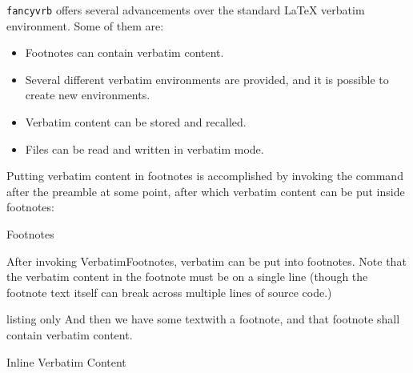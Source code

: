 \documentclass[article,a4paper,oneside,10pt]{memoir}
\makeatletter
\renewcommand{\section}{%
  \sechook%
  \@startsection{section}{1}%
      {\secindent}%
      {\beforesecskip}%
      {\aftersecskip}%
      {\sffamily\secheadstyle}} %
\newcommand\code[1]{\texttt{#1}}
\makeatother
\begin{document}
\code{fancyvrb}  offers  several  advancements   over  the  standard  \LaTeX{}
verbatim environment. Some of them are:

\begin{itemize}\firmlist
    \item
        Footnotes can contain verbatim content.
    \item
        Several  different  verbatim  environments  are provided,  and  it  is
        possible to create new environments.
    \item
        Verbatim content can be stored and recalled.
    \item
        Files can be read and written in verbatim mode.
\end{itemize}

Putting  verbatim  content  in  footnotes  is  accomplished  by  invoking  the
\texttt{\VerbatimFootnotes}  command  after  the  preamble  at  some
point, after which verbatim content can be put inside footnotes:


\section{Footnotes}
\label{sec:fancyvrb:footnotes}

\VerbatimFootnotes
After    invoking    VerbatimFootnotes,    verbatim   can    be    put    into
footnotes\footnotemark. Note that the verbatim content in the footnote must be
on a  single line (though the  footnote text itself can  break across multiple
lines of source code.)


\begin{tcblisting}{listing only}
    \VerbatimFootnotes
    And then we have some text\footnotemark with a footnote, and that footnote
    shall contain verbatim content.
\end{tcblisting}


\section{Inline Verbatim Content}
\label{sec:fancyvrb:inline}
\end{document}
